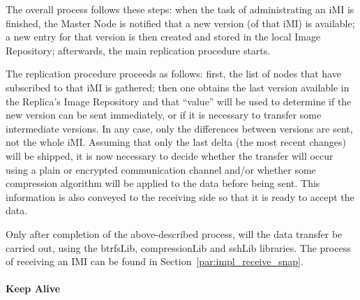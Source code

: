 The overall process follows these steps: when the task of administrating an iMI is finished, the Master Node is notified that a new version (of that iMI) is available; a new entry for that version is then created and stored in the local Image Repository; afterwards, the main replication procedure starts.

The replication procedure proceeds as follows: first, the list of nodes that have subscribed to that iMI is gathered; then one obtains the last version available in the Replica’s Image Repository and that “value” will be used to determine if the new version can be sent immediately, or if it is necessary to transfer some intermediate versions. In any case, only the differences between versions are sent, not the whole iMI. Assuming that only the last delta (the most recent changes) will be shipped, it is now necessary to decide whether the transfer will occur using a plain or encrypted communication channel and/or whether some compression algorithm will be applied to the data before being sent. This information is also conveyed to the receiving side so that it is ready to accept the data.

Only after completion of the above-described process, will the data transfer be carried out, using the btrfsLib, compressionLib and sshLib libraries. The process of receiving an IMI can be found in Section~\ref{par:impl_receive_snap}.

\paragraph{Keep Alive}
\label{par:impl_icbdrep_keep_alive}



